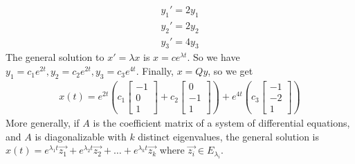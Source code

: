 \documentclass[10pt]{article}
\begin{document}
\begin{multicols*}{2}
\begin{enumerate}
\begin{enumerate}
        \begin{align*}
            y_1' = 2y_1 \\
            y_2' = 2y_2 \\
            y_3' = 4y_3
        \end{align*}
        The general solution to $x' = \lambda x$ is $x = ce^{\lambda t}$. So we have $y_1 = c_1e^{2t}, y_2 = c_2e^{2t}, y_3 = c_3e^{4t}$. Finally, $x = Qy$, so we get
        \begin{align*}
            x(t) = e^{2t} \left( c_1 \begin{bmatrix} -1 \\ 0 \\ 1 \end{bmatrix} + c_2 \begin{bmatrix} 0 \\ -1 \\ 1 \end{bmatrix} \right) + e^{4t} \left( c_3 \begin{bmatrix} -1 \\ -2 \\ 1 \end{bmatrix} \right) 
        \end{align*}
        More generally, if $A$ is the coefficient matrix of a system of differential equations, and $A$ is diagonalizable with $k$ distinct eigenvalues, the general solution is $x(t) = e^{\lambda_1 t}\vec{z_1} + e^{\lambda_2 t}\vec{z_2}+\hdots+e^{\lambda_k t}\vec{z_k}$ where $\vec{z_i} \in E_{\lambda_i}$. 
    \end{enumerate}
    

\end{enumerate}
\end{multicols*}
\end{document}

